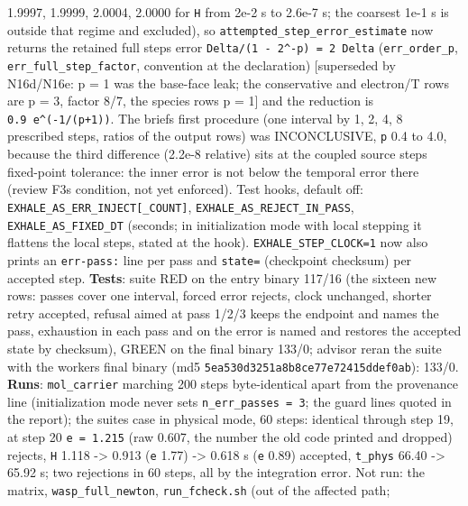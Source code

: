 \documentclass[english,a4paper]{my_memo}
\begin{document}
\begin{itemize}
  1.9997, 1.9999, 2.0004, 2.0000 for \texttt{H} from 2e-2 s to 2.6e-7 s; the
  coarsest 1e-1 s is outside that regime and excluded), so
  \texttt{attempted\_step\_error\_estimate} now returns the retained full step\textquotesingle s
  error \texttt{Delta/(1\ -\ 2\^{}-p)\ =\ 2\ Delta} (\texttt{err\_order\_p},
  \texttt{err\_full\_step\_factor}, convention at the declaration) {[}superseded by
  N16d/N16e: p = 1 was the base-face leak; the conservative and electron/T
  rows are p = 3, factor 8/7, the species rows p = 1{]} and the reduction
  is \texttt{0.9\ e\^{}(-1/(p+1))}. The brief\textquotesingle s first procedure (one interval by 1, 2,
  4, 8 prescribed steps, ratios of the output rows) was INCONCLUSIVE, \texttt{p}
  0.4 to 4.0, because the third difference (2.2e-8 relative) sits at the
  coupled source step\textquotesingle s fixed-point tolerance: the inner error is not
  below the temporal error there (review F3\textquotesingle s condition, not yet
  enforced). Test hooks, default off: \texttt{EXHALE\_AS\_ERR\_INJECT{[}\_COUNT{]}},
  \texttt{EXHALE\_AS\_REJECT\_IN\_PASS}, \texttt{EXHALE\_AS\_FIXED\_DT} (seconds; in
  initialization mode with local stepping it flattens the local steps,
  stated at the hook). \texttt{EXHALE\_STEP\_CLOCK=1} now also prints an \texttt{err-pass:}
  line per pass and \texttt{state=} (checkpoint checksum) per accepted step.
  \textbf{Tests}: suite RED on the entry binary 117/16 (the sixteen new rows:
  passes cover one interval, forced error rejects, clock unchanged,
  shorter retry accepted, refusal aimed at pass 1/2/3 keeps the endpoint
  and names the pass, exhaustion in each pass and on the error is named
  and restores the accepted state by checksum), GREEN on the final binary
  133/0; advisor reran the suite with the worker\textquotesingle s final binary (md5
  \texttt{5ea530d3251a8b8ce77e72415ddef0ab}): 133/0. \textbf{Runs}: \texttt{mol\_carrier}
  marching 200 steps byte-identical apart from the provenance line
  (initialization mode never sets \texttt{n\_err\_passes\ =\ 3}; the guard lines
  quoted in the report); the suite\textquotesingle s case in physical mode, 60 steps:
  identical through step 19, at step 20 \texttt{e\ =\ 1.215} (raw 0.607, the number
  the old code printed and dropped) rejects, \texttt{H} 1.118 -\textgreater{} 0.913 (\texttt{e} 1.77)
  -\textgreater{} 0.618 s (\texttt{e} 0.89) accepted, \texttt{t\_phys} 66.40 -\textgreater{} 65.92 s; two
  rejections in 60 steps, all by the integration error. Not run: the
  matrix, \texttt{wasp\_full\_newton}, \texttt{run\_fcheck.sh} (out of the affected path;

\end{itemize}
\end{document}

